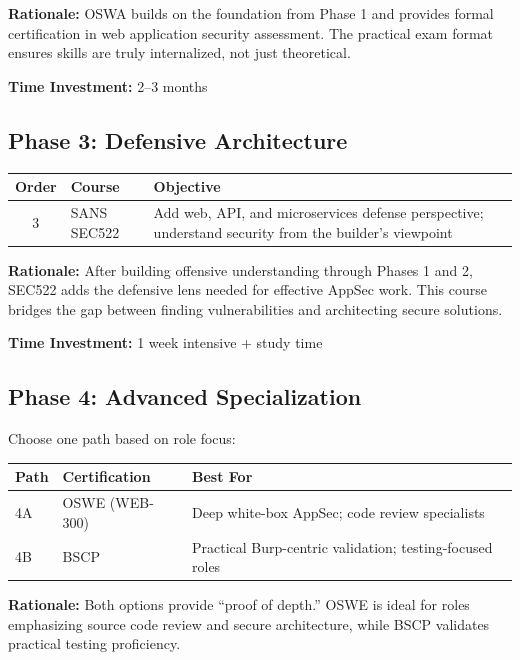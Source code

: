\documentclass[11pt,letterpaper]{article}
\begin{document}
\textbf{Rationale:} OSWA builds on the foundation from Phase 1 and provides formal certification in web application security assessment. The practical exam format ensures skills are truly internalized, not just theoretical.

\textbf{Time Investment:} 2--3 months

\subsection{Phase 3: Defensive Architecture}

\begin{table}[H]
\centering
\begin{tabularx}{\textwidth}{c l X}
\toprule
\textbf{Order} & \textbf{Course} & \textbf{Objective} \\
\midrule
3 & SANS SEC522 & Add web, API, and microservices defense perspective; understand security from the builder's viewpoint \\
\bottomrule
\end{tabularx}
\end{table}

\textbf{Rationale:} After building offensive understanding through Phases 1 and 2, SEC522 adds the defensive lens needed for effective AppSec work. This course bridges the gap between finding vulnerabilities and architecting secure solutions.

\textbf{Time Investment:} 1 week intensive + study time

\subsection{Phase 4: Advanced Specialization}

Choose one path based on role focus:

\begin{table}[H]
\centering
\begin{tabularx}{\textwidth}{l l X}
\toprule
\textbf{Path} & \textbf{Certification} & \textbf{Best For} \\
\midrule
4A & OSWE (WEB-300) & Deep white-box AppSec; code review specialists \\
\midrule
4B & BSCP & Practical Burp-centric validation; testing-focused roles \\
\bottomrule
\end{tabularx}
\end{table}

\textbf{Rationale:} Both options provide ``proof of depth.'' OSWE is ideal for roles emphasizing source code review and secure architecture, while BSCP validates practical testing proficiency.
\end{document}
